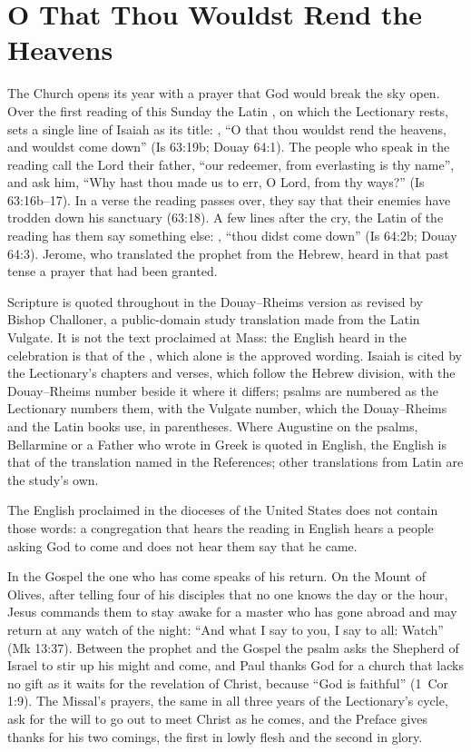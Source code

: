 \section{O That Thou Wouldst Rend the Heavens}
\label{sec:opening}

The Church opens its year with a prayer that God would break the sky open.
Over the first reading of this Sunday the Latin ,
on which the Lectionary rests, sets a single line of Isaiah as its title:
, ``O that thou wouldst rend
the heavens, and wouldst come down'' (Is 63:19b; Douay 64:1). The people
who speak in the reading call the Lord their father, ``our redeemer, from
everlasting is thy name'', and ask him, ``Why hast thou made us to err, O
Lord, from thy ways?'' (Is 63:16b--17). In a verse the reading passes over,
they say that their enemies have trodden down his sanctuary (63:18). A few
lines after the cry, the Latin of the reading has them say something else:
, ``thou didst come down'' (Is 64:2b; Douay 64:3). Jerome,
who translated the prophet from the Hebrew, heard in that past tense a prayer
that had been granted.

{\small\noindent Scripture is quoted throughout in the Douay--Rheims version
as revised by Bishop Challoner, a public-domain study translation made from
the Latin Vulgate. It is not the text proclaimed at Mass: the English heard in
the celebration is that of the , which alone is the approved
wording. Isaiah is cited by the Lectionary's chapters and verses, which follow
the Hebrew division, with the Douay--Rheims number beside it where it
differs; psalms are numbered as the Lectionary numbers them, with the Vulgate
number, which the Douay--Rheims and the Latin books use, in parentheses.
Where Augustine on the psalms, Bellarmine or a Father who wrote in Greek is
quoted in English, the English is that of the translation named in the
References; other translations from Latin are the study's own.\par}
\medskip

The English proclaimed in the dioceses of the United States does not contain
those words: a congregation that hears the reading in English hears a people asking God to
come and does not hear them say that he came.

In the Gospel the one who has come speaks of his return. On the Mount of Olives,
after telling four of his disciples that no one knows the day or the hour,
Jesus commands them to stay awake for a master who has gone abroad and may
return at any watch of the night: ``And what I say to you, I say to all:
Watch'' (Mk 13:37). Between the prophet and the Gospel the psalm asks the
Shepherd of Israel to stir up his might and come, and Paul thanks God for a
church that lacks no gift as it waits for the revelation of Christ, because
``God is faithful'' (1~Cor 1:9). The Missal's prayers, the same in all three
years of the Lectionary's cycle, ask for the will to go out to meet Christ as
he comes, and the Preface gives thanks for his two comings, the first in
lowly flesh and the second in glory.

